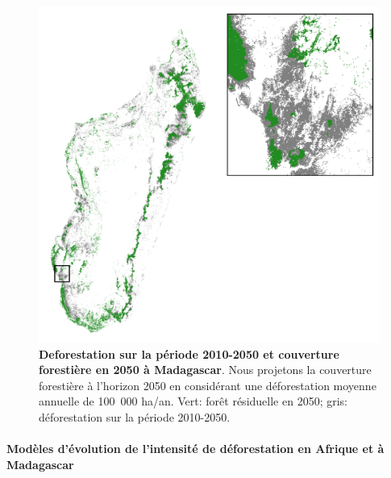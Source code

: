 \documentclass[12pt,]{article}
\let\oldparagraph\paragraph
\renewcommand{\paragraph}[1]{\oldparagraph{#1}\mbox{}}
\begin{document}
\begin{figure}[H]

{\centering \includegraphics[width=\textwidth]{figures/forest_cover_2050} 

}

\caption{\textbf{Deforestation sur la période 2010-2050 et
couverture forestière en 2050 à Madagascar}. Nous projetons la
couverture forestière à l'horizon 2050 en considérant une déforestation
moyenne annuelle de 100~000 ha/an. Vert: forêt résiduelle en 2050; gris:
déforestation sur la période 2010-2050.}\label{fig:fc2050}
\end{figure}

\hypertarget{modeles-devolution-de-lintensite-de-deforestation-en-afrique-et-a-madagascar-1}{%
\paragraph{Modèles d'évolution de l'intensité de déforestation en
Afrique et à
Madagascar}\label{modeles-devolution-de-lintensite-de-deforestation-en-afrique-et-a-madagascar-1}}
\end{document}
